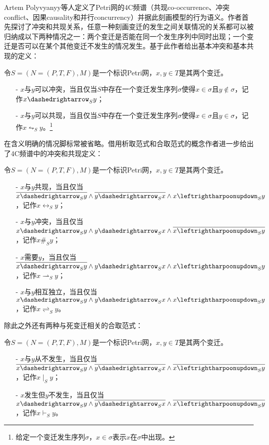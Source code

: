 Artem Polyvyanyy等人定义了Petri网的4C频谱（共现co-occurrence、冲突conflict、因果causality和并行concurrency）并据此刻画模型的行为语义\cite{polyvyanyy20144c}。作者首先探讨了冲突和共现关系，任意一种刻画变迁的发生之间关联情况的关系都可以被归纳成以下两种情况之一：两个变迁是否能在同一个发生序列中同时出现；一个变迁是否可以在某个其他变迁不发生的情况发生。基于此作者给出基本冲突和基本共现的定义：
\begin{definition}[基本冲突和基本共现]
令$S=(N=(P,T,F),M)$是一个标识Petri网，$x,y\in T$是其两个变迁。
  \begin{itemize}
    \item[-] $x$与$y$可以冲突，当且仅当$S$中存在一个变迁发生序列$\sigma$使得$x\in\sigma$且$y\notin\sigma$，记作$x\dashedrightarrow_{S}y$；
    \item[-] $x$与$y$可以共现，当且仅当$S$中存在一个变迁发生序列$\sigma$使得$x\in\sigma$且$y\in\sigma$，记作$x\leftrightharpoonupdown_{S}y$。\footnote{给定一个变迁发生序列$\sigma$，$x\in\sigma$表示$x$在$\sigma$中出现。}
  \end{itemize}
\end{definition}
在含义明确的情况脚标常被省略。借用析取范式和合取范式的概念作者进一步给出了4C频谱中的冲突和共现定义：
\begin{definition}[冲突和共现]
令$S=(N=(P,T,F),M)$是一个标识Petri网，$x,y\in T$是其两个变迁。
  \begin{itemize}
    \item[-] $x$与$y$共现，当且仅当$\overline{x\dashedrightarrow_{S}y}\wedge\overline{y\dashedrightarrow_{S}x}\wedge x\leftrightharpoonupdown_{S}y$，记作$x\leftrightarrow_{S}y$；
    \item[-] $x$与$y$冲突，当且仅当$x\dashedrightarrow_{S}y\wedge y\dashedrightarrow_{S}x\wedge\overline{x\leftrightharpoonupdown_{S}y}$，记作$x\#_{S}y$；
    \item[-] $x$需要$y$，当且仅当$\overline{x\dashedrightarrow_{S}y}\wedge y\dashedrightarrow_{S}x\wedge x\leftrightharpoonupdown_{S}y$，记作$x\rightharpoonup_{S}y$；
    \item[-] $x$与$y$相互独立，当且仅当$x\dashedrightarrow_{S}y\wedge y\dashedrightarrow_{S}x\wedge x\leftrightharpoonupdown_{S}y$，记作$x\rightleftharpoons_{S}y$。
  \end{itemize}
\end{definition}
除此之外还有两种与死变迁相关的合取范式：
\begin{definition}[不发生]
令$S=(N=(P,T,F),M)$是一个标识Petri网，$x,y\in T$是其两个变迁。
  \begin{itemize}
    \item[-] $x$与$y$从不发生，当且仅当$\overline{x\dashedrightarrow_{S}y}\wedge\overline{y\dashedrightarrow_{S}x}\wedge\overline{x\leftrightharpoonupdown_{S}y}$，记作$x\mid_{S}y$；
    \item[-] $x$发生但$y$不发生，当且仅当$x\dashedrightarrow_{S}y\wedge\overline{y\dashedrightarrow_{S}x}\wedge\overline{x\leftrightharpoonupdown_{S}y}$，记作$x\vdash_{S}y$。
  \end{itemize}
\end{definition}
